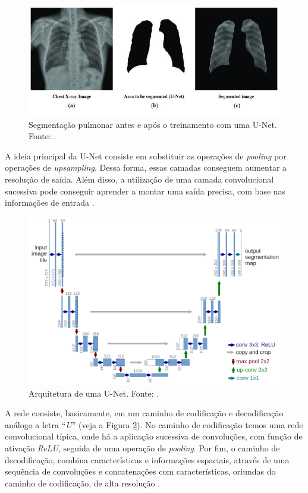 \documentclass[12pt]{article}
\begin{document}
\begin{figure}[!ht]
    \centering
    \includegraphics[width = 0.6\textheight]{figures/exemplo_unet.png}
    \caption{Segmentação pulmonar antes e após o treinamento com uma U-Net. Fonte: \cite{heo2019deep}.}
    \label{fig:exemplo_unet}
\end{figure}

A ideia principal da U-Net consiste em substituir as operações de \textit{pooling} por operações de \textit{upsampling}. Dessa forma, essas camadas conseguem aumentar a resolução de saída. Além disso, a utilização de uma camada convolucional sucessiva pode conseguir aprender a montar uma saída precisa, com base nas informações de entrada \cite{unet}.


\begin{figure}[!ht]
    \centering
    \includegraphics[width = 0.6\textheight]{figures/unet.png}
    \caption{Arquitetura de uma U-Net. Fonte: \cite{unet}.}
    \label{fig:unet}
\end{figure}

A rede consiste, basicamente, em um caminho de codificação e decodificação análogo a letra ``\textit{U}'' (veja a Figura \ref{fig:unet}). No caminho de codificação temos uma rede convolucional típica, onde há a aplicação sucessiva de convoluções, com função de ativação \textit{ReLU}, seguida de uma operação de \textit{pooling}. Por fim, o caminho de decodificação, combina características e informações espaciais, através de uma sequência de convoluções e concatenações com características, oriundas do caminho de codificação, de alta resolução \cite{iglovikov2018ternausnet}.
\end{document}
